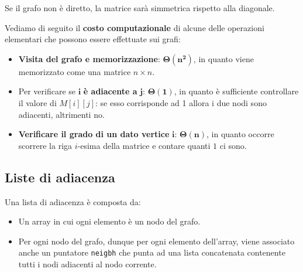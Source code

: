 \documentclass[12pt]{report}
\begin{document}
	Se il grafo non è diretto, la matrice sarà simmetrica rispetto alla diagonale.
	
	Vediamo di seguito il \textbf{costo computazionale} di alcune delle operazioni elementari che possono essere effettuate sui grafi:
	\begin{itemize}
		\item \textbf{Visita del grafo e memorizzazione}: $\mathbf{\Theta(n^2)}$, in quanto viene memorizzato come una matrice $n \times n$.
		
		\item Per verificare se $\mathbf{i}$ \textbf{è adiacente a} $\mathbf{j}$: $\mathbf{\Theta(1)}$, in quanto è sufficiente controllare il valore di $M[i][j]$: se esso corrisponde ad 1 allora i due nodi sono adiacenti, altrimenti no.
		
		\item \textbf{Verificare il grado di un dato vertice} $\mathbf{i}$: $\mathbf{\Theta(n)}$, in quanto occorre scorrere la riga $i$-esima della matrice e contare quanti $1$ ci sono.
	\end{itemize}
	
	\newpage
	\subsection{Liste di adiacenza}
	
	Una lista di adiacenza è composta da:
	\begin{itemize}
		\item Un array in cui ogni elemento è un nodo del grafo.
		
		\item Per ogni nodo del grafo, dunque per ogni elemento dell'array, viene associato anche un puntatore \texttt{neigbh} che punta ad una lista concatenata contenente tutti i nodi adiacenti al nodo corrente.
	\end{itemize}
	
\end{document}
